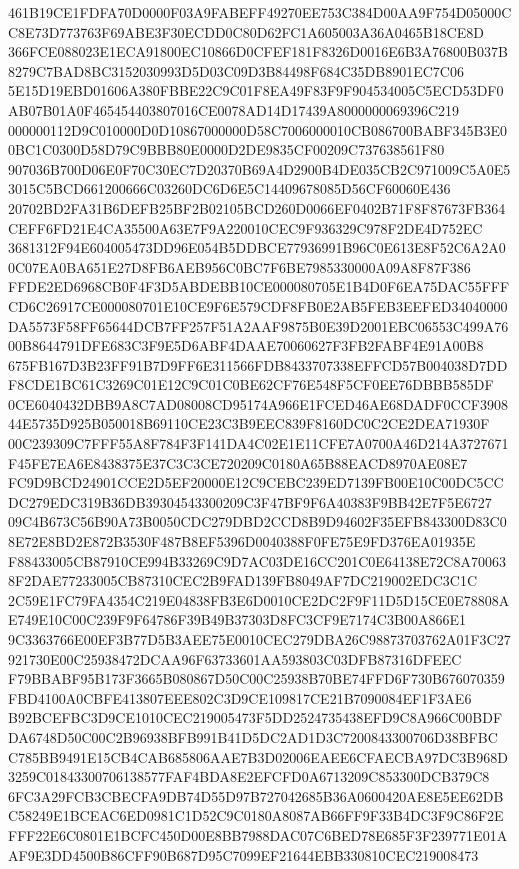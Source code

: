 \documentclass[UTF8,fontset=fandol,zihao=-4,a4paper]{ctexart}
\begin{document}
{{461B19CE1FDFA70D0000F03A9FABEFF49270EE753C384D00AA9F754D05000CC8E73D773763F69ABE3F30ECDD0C80D62FC1A605003A36A0465B18CE8D
366FCE088023E1ECA91800EC10866D0CFEF181F8326D0016E6B3A76800B037B8279C7BAD8BC3152030993D5D03C09D3B84498F684C35DB8901EC7C06
5E15D19EBD01606A380FBBE22C9C01F8EA49F83F9F904534005C5ECD53DF0AB07B01A0F465454403807016CE0078AD14D17439A8000000069396C219
000000112D9C010000D0D10867000000D58C7006000010CB086700BABF345B3E00BC1C0300D58D79C9BBB80E0000D2DE9835CF00209C737638561F80
907036B700D06E0F70C30EC7D20370B69A4D2900B4DE035CB2C971009C5A0E53015C5BCD661200666C03260DC6D6E5C14409678085D56CF60060E436
20702BD2FA31B6DEFB25BF2B02105BCD260D0066EF0402B71F8F87673FB364CEFF6FD21E4CA35500A63E7F9A220010CEC9F936329C978F2DE4D752EC
3681312F94E604005473DD96E054B5DDBCE77936991B96C0E613E8F52C6A2A00C07EA0BA651E27D8FB6AEB956C0BC7F6BE7985330000A09A8F87F386
FFDE2ED6968CB0F4F3D5ABDEBB10CE000080705E1B4D0F6EA75DAC55FFFCD6C26917CE000080701E10CE9F6E579CDF8FB0E2AB5FEB3EEFED34040000
DA5573F58FF65644DCB7FF257F51A2AAF9875B0E39D2001EBC06553C499A7600B8644791DFE683C3F9E5D6ABF4DAAE70060627F3FB2FABF4E91A00B8
675FB167D3B23FF91B7D9FF6E311566FDB8433707338EFFCD57B004038D7DDF8CDE1BC61C3269C01E12C9C01C0BE62CF76E548F5CF0EE76DBBB585DF
0CE6040432DBB9A8C7AD08008CD95174A966E1FCED46AE68DADF0CCF390844E5735D925B050018B69110CE23C3B9EEC839F8160DC0C2CE2DEA71930F
00C239309C7FFF55A8F784F3F141DA4C02E1E11CFE7A0700A46D214A3727671F45FE7EA6E8438375E37C3C3CE720209C0180A65B88EACD8970AE08E7
FC9D9BCD24901CCE2D5EF20000E12C9CEBC239ED7139FB00E10C00DC5CCDC279EDC319B36DB39304543300209C3F47BF9F6A40383F9BB42E7F5E6727
09C4B673C56B90A73B0050CDC279DBD2CCD8B9D94602F35EFB843300D83C08E72E8BD2E872B3530F487B8EF5396D0040388F0FE75E9FD376EA01935E
F88433005CB87910CE994B33269C9D7AC03DE16CC201C0E64138E72C8A700638F2DAE77233005CB87310CEC2B9FAD139FB8049AF7DC219002EDC3C1C
2C59E1FC79FA4354C219E04838FB3E6D0010CE2DC2F9F11D5D15CE0E78808AE749E10C00C239F9F64786F39B49B37303D8FC3CF9E7174C3B00A866E1
9C3363766E00EF3B77D5B3AEE75E0010CEC279DBA26C98873703762A01F3C27921730E00C25938472DCAA96F63733601AA593803C03DFB87316DFEEC
F79BBABF95B173F3665B080867D50C00C25938B70BE74FFD6F730B676070359FBD4100A0CBFE413807EEE802C3D9CE109817CE21B7090084EF1F3AE6
B92BCEFBC3D9CE1010CEC219005473F5DD2524735438EFD9C8A966C00BDFDA6748D50C00C2B96938BFB991B41D5DC2AD1D3C7200843300706D38BFBC
C785BB9491E15CB4CAB685806AAE7B3D02006EAEE6CFAECBA97DC3B968D3259C01843300706138577FAF4BDA8E2EFCFD0A6713209C853300DCB379C8
6FC3A29FCB3CBECFA9DB74D55D97B727042685B36A0600420AE8E5EE62DBC58249E1BCEAC6ED0981C1D52C9C0180A8087AB66FF9F33B4DC3F9C86F2E
FFF22E6C0801E1BCFC450D00E8BB7988DAC07C6BED78E685F3F239771E01AAF9E3DD4500B86CFF90B687D95C7099EF21644EBB330810CEC219008473
}}
\end{document}
